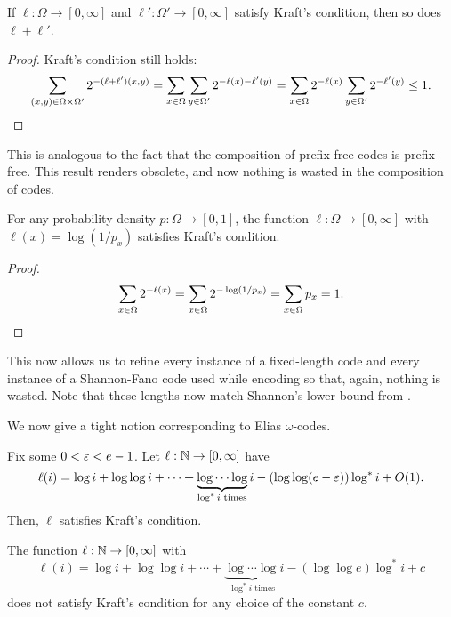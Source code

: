 \begin{lem}
  If $\ell : \Omega \to [0, \infty]$ and $\ell' : \Omega' \to [0,
  \infty]$ satisfy Kraft's condition, then so does $\ell + \ell'$.
\end{lem}
\begin{proof}
  Kraft's condition still holds:
  \[\sum_{(x, y) \in \Omega \times \Omega'} 2^{-(\ell + \ell')(x, y)} = \sum_{x
    \in \Omega} \sum_{y \in \Omega'} 2^{-\ell(x) - \ell'(y)} = \sum_{x
    \in \Omega} 2^{-\ell(x)} \sum_{y \in \Omega'} 2^{-\ell'(y)} \leq
  1. \qedhere\]
\end{proof}
This is analogous to the fact that the composition of prefix-free
codes is prefix-free. This result renders 
obsolete, and now nothing is wasted in the composition of codes.

\begin{lem}
  For any probability density $p : \Omega \to [0, 1]$, the function
  $\ell : \Omega \to [0, \infty]$ with $\ell(x) = \log (1/p_x)$
  satisfies Kraft's condition.
\end{lem}
\begin{proof}
  \[\sum_{x \in \Omega} 2^{-\ell(x)} = \sum_{x \in \Omega} 2^{-\log (1/p_x)} =
  \sum_{x \in \Omega} p_x = 1. \qedhere\]
\end{proof}
This now allows us to refine every instance of a fixed-length code and
every instance of a Shannon-Fano code used while encoding so that,
again, nothing is wasted. Note that these lengths now match Shannon's
lower bound from .

We now give a tight notion corresponding to Elias $\omega$-codes.
\begin{thm}
  Fix some $0 < \varepsilon < e - 1$. Let $\ell : \mathbb{N} \to [0, \infty]$ have
  \[\ell(i) = \log i + \log \log i + \cdots + \underbrace{\log \cdots \log}_{\text{$\log^* i$ times}} i -
  (\log \log (e - \varepsilon)) \log^* i + O(1).\]
  Then, $\ell$ satisfies Kraft's condition.
\end{thm}
\begin{thm}
  The function $\ell : \mathbb{N} \to [0, \infty]$ with
  \[\ell(i) = \log i + \log \log i + \cdots + \underbrace{\log \cdots \log}_{\text{$\log^* i$ times}} i -
  (\log \log e) \log^* i + c\]
  does not satisfy Kraft's condition for any choice of the constant
  $c$.
\end{thm}

